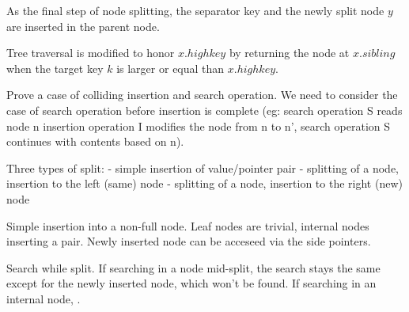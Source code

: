 
As the final step of node splitting, the separator key and the newly split node $y$ are inserted in the parent node.


Tree traversal is modified to honor $x.highkey$ by returning the node at $x.sibling$ when the target key $k$ is larger or equal than $x.highkey$.


Prove a case of colliding insertion and search operation. We need to consider the case of search operation before insertion is complete (eg: search operation S reads node n insertion operation I modifies the node from n to n', search operation S continues with contents based on n).

Three types of split:
- simple insertion of value/pointer pair
- splitting of a node, insertion to the left (same) node
- splitting of a node, insertion to the right (new) node

Simple insertion into a non-full node. Leaf nodes are trivial, internal nodes inserting a pair. Newly inserted node can be acceseed via the side pointers.

Search while split. If searching in a node mid-split, the search stays the same except for the newly inserted node, which won't be found. If searching in an internal node, .

